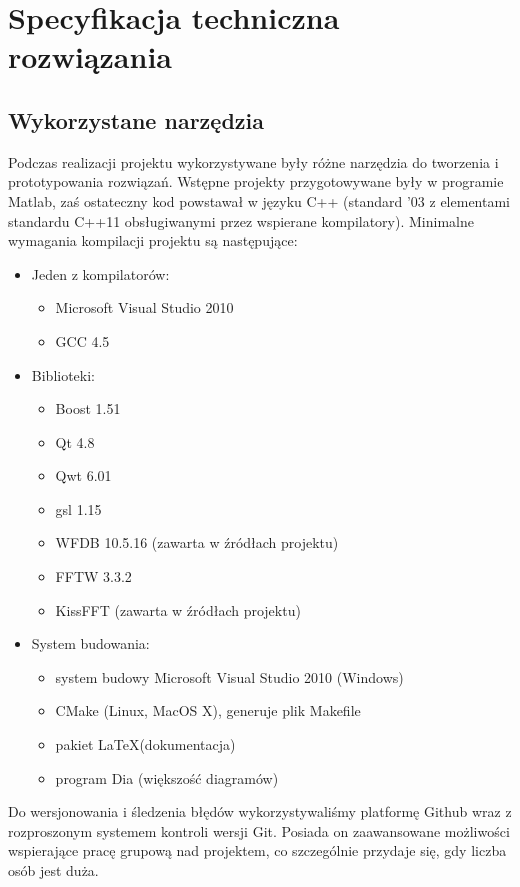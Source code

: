 \documentclass[a4paper, 11pt]{article}
\begin{document}
\section{Specyfikacja techniczna rozwiązania}
\label{sec:techspec}

\subsection{Wykorzystane narzędzia}
\label{sec:tools}

Podczas realizacji projektu wykorzystywane były różne narzędzia do tworzenia i prototypowania rozwiązań. Wstępne projekty przygotowywane były w programie Matlab, zaś ostateczny kod powstawał w języku C++ (standard '03 z elementami standardu C++11 obsługiwanymi przez wspierane kompilatory).
Minimalne wymagania kompilacji projektu są następujące:
\begin{itemize}
  \item Jeden z kompilatorów:
  \begin{itemize}
    \item Microsoft Visual Studio 2010
    \item GCC 4.5
  \end{itemize}
  \item Biblioteki:
  \begin{itemize}
    \item Boost 1.51
    \item Qt 4.8
    \item Qwt 6.01
    \item gsl 1.15
    \item WFDB 10.5.16 (zawarta w źródłach projektu)
    \item FFTW 3.3.2
    \item KissFFT (zawarta w źródłach projektu)
  \end{itemize}
  \item System budowania:
  \begin{itemize}
	  \item system budowy Microsoft Visual Studio 2010 (Windows)
	  \item CMake (Linux, MacOS X), generuje plik Makefile
	  \item pakiet \LaTeX (dokumentacja)
	  \item program Dia (większość diagramów)
  \end{itemize}
\end{itemize}

Do wersjonowania i śledzenia błędów wykorzystywaliśmy platformę Github wraz z rozproszonym systemem kontroli wersji Git. Posiada on zaawansowane możliwości wspierające pracę grupową nad projektem, co szczególnie przydaje się, gdy liczba osób jest duża.
\end{document}
